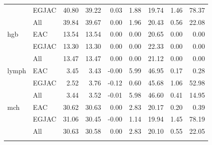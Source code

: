\documentclass[12pt]{article}
\begin{document}
\begin{table}[ht]
\begin{tabular}{llrrrrrrr}
   & EGJAC & 40.80 & 39.22 & 0.03 & 1.88 & 19.74 & 1.46 & 78.37 \\ 
   & All & 39.84 & 39.67 & 0.00 & 1.96 & 20.43 & 0.56 & 22.08 \\  \addlinespace
  hgb & EAC & 13.54 & 13.54 & 0.00 & 0.00 & 20.65 & 0.00 & 0.00 \\ 
   & EGJAC & 13.30 & 13.30 & 0.00 & 0.00 & 22.33 & 0.00 & 0.00 \\ 
   & All & 13.47 & 13.47 & 0.00 & 0.00 & 21.12 & 0.00 & 0.00 \\  \addlinespace
  lymph & EAC & 3.45 & 3.43 & -0.00 & 5.99 & 46.95 & 0.17 & 0.28 \\ 
   & EGJAC & 2.52 & 3.76 & -0.12 & 0.60 & 45.68 & 1.06 & 52.98 \\ 
   & All & 3.44 & 3.52 & -0.01 & 5.98 & 46.60 & 0.41 & 14.95 \\  \addlinespace
  mch & EAC & 30.62 & 30.63 & 0.00 & 2.83 & 20.17 & 0.20 & 0.39 \\ 
   & EGJAC & 31.06 & 30.45 & -0.00 & 1.14 & 19.94 & 1.45 & 78.19 \\ 
   & All & 30.63 & 30.58 & 0.00 & 2.83 & 20.10 & 0.55 & 22.05 \\  \addlinespace
   \bottomrule
\end{tabular}
\end{table}
\end{document}
